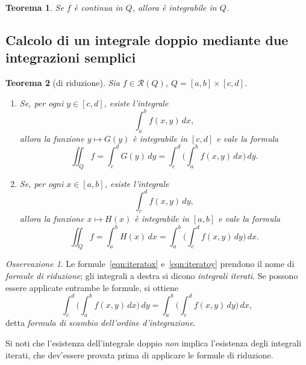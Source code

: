 \documentclass[a4paper]{book}
\numberwithin{equation}{section}
\theoremstyle{plain}
\newtheorem{teor}{Teorema}[section]
\theoremstyle{definition}
\theoremstyle{remark}
\newtheorem{oss}{Osservazione}[section]
\theoremstyle{example}
\begin{document}
\begin{teor}
Se $f$ è continua in $Q$, allora è integrabile in $Q$.
\end{teor}
\subsection{Calcolo di un integrale doppio mediante due integrazioni semplici}
\begin{teor}[di riduzione]
Sia $f \in \mathcal{R}(Q)$, $Q = [a, b] \times [c, d]$.
	\begin{enumerate}
	\item Se, per ogni $y \in [c, d]$, esiste l'integrale
		\begin{equation*}
		\int_a^b f(x, y) \, dx,
		\end{equation*}
	allora la funzione $y \mapsto G(y)$ è integrabile in $[c, d]$ e vale la formula
		\begin{equation}
		\label{eqn:iteratox}
		\iint_Q f = \int_c^d G(y)\, dy = \int_c^d \biggl( \int_a^b f(x, y) \, dx \biggr) \, dy.
		\end{equation}

	\item Se, per ogni $x \in [a, b]$, esiste l'integrale
		\begin{equation*}
		\int_c^d f(x,y) \, dy,
		\end{equation*}
	allora la funzione $x \mapsto H(x)$ è integrabile in $[a, b]$ e vale la formula
		\begin{equation}
		\label{eqn:iteratoy}
		\iint_Q f = \int_a^b H(x) \, dx = \int_a^b \biggl( \int_c^d f(x,y) \, dy \biggr) \, dx.
		\end{equation}
	\end{enumerate}
\end{teor}

\begin{oss}
Le formule~\eqref{eqn:iteratox} e~\eqref{eqn:iteratoy} prendono il nome di \emph{formule di riduzione}; gli integrali a destra si dicono \emph{integrali iterati}. Se possono essere applicate entrambe le formule, si ottiene
	\begin{equation}
	\int_c^d \biggl( \int_a^b f(x,y) \, dx \biggr) \, dy = \int_a^b \biggl( \int_c^d f(x,y) \,dy \biggr) \, dx,
	\end{equation}
detta \emph{formula di scambio dell'ordine d'integrazione}.
\end{oss}

Si noti che l'esistenza dell'integrale doppio \emph{non} implica l'esistenza degli integrali iterati, che dev'essere provata prima di applicare le formule di riduzione.
\end{document}
